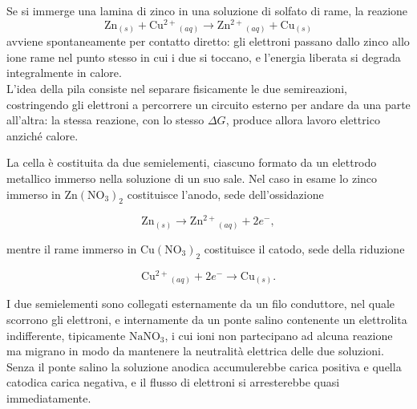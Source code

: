 Se si immerge una lamina di zinco in una soluzione di solfato di rame, la reazione
\begin{equation}
    \mathrm{Zn}_{(s)} + \mathrm{Cu^{2+}}_{(aq)} \longrightarrow \mathrm{Zn^{2+}}_{(aq)} + \mathrm{Cu}_{(s)}
    \label{eq:daniell}
\end{equation}
avviene spontaneamente per contatto diretto: gli elettroni passano dallo zinco allo ione rame nel punto stesso in cui i due si toccano, e l'energia liberata si degrada integralmente in calore.\\

L'idea della pila consiste nel separare fisicamente le due semireazioni, costringendo gli elettroni a percorrere un circuito esterno per andare da una parte all'altra: la stessa reazione, con lo stesso $\Delta G$, produce allora lavoro elettrico anziché calore.

\newpage

La cella è costituita da due semielementi, ciascuno formato da un elettrodo metallico immerso nella soluzione di un suo sale.
Nel caso in esame lo zinco immerso in $\mathrm{Zn(NO_3)_2}$ costituisce l'anodo, sede dell'ossidazione

\begin{equation*}
    \mathrm{Zn}_{(s)} \longrightarrow \mathrm{Zn^{2+}}_{(aq)} + 2e^- ,
\end{equation*}

mentre il rame immerso in $\mathrm{Cu(NO_3)_2}$ costituisce il catodo, sede della riduzione

\begin{equation*}
    \mathrm{Cu^{2+}}_{(aq)} + 2e^- \longrightarrow \mathrm{Cu}_{(s)} .
\end{equation*}

I due semielementi sono collegati esternamente da un filo conduttore, nel quale scorrono gli elettroni, e internamente da un ponte salino contenente un elettrolita indifferente, tipicamente $\mathrm{NaNO_3}$, i cui ioni non partecipano ad alcuna reazione ma migrano in modo da mantenere la neutralità elettrica delle due soluzioni.
Senza il ponte salino la soluzione anodica accumulerebbe carica positiva e quella catodica carica negativa, e il flusso di elettroni si arresterebbe quasi immediatamente.

